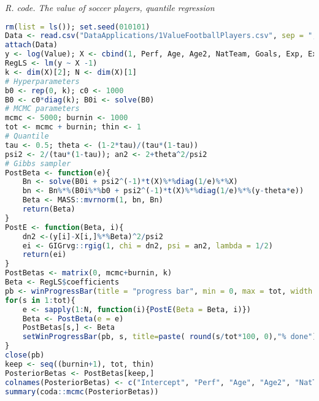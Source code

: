 \begin{enumerate}[leftmargin=*]
\begin{tcolorbox}[enhanced,width=4.67in,center upper,
	fontupper=\large\bfseries,drop shadow southwest,sharp corners]
	\textit{R. code. The value of soccer players, quantile regression}
	\begin{VF}
		\begin{lstlisting}[language=R]
rm(list = ls()); set.seed(010101)
Data <- read.csv("DataApplications/1ValueFootballPlayers.csv", sep = ",", header = TRUE, fileEncoding = "latin1")
attach(Data)
y <- log(Value); X <- cbind(1, Perf, Age, Age2, NatTeam, Goals, Exp, Exp2)
RegLS <- lm(y ~ X -1)
k <- dim(X)[2]; N <- dim(X)[1]
# Hyperparameters
b0 <- rep(0, k); c0 <- 1000
B0 <- c0*diag(k); B0i <- solve(B0)
# MCMC parameters
mcmc <- 5000; burnin <- 1000
tot <- mcmc + burnin; thin <- 1
# Quantile
tau <- 0.5; theta <- (1-2*tau)/(tau*(1-tau))
psi2 <- 2/(tau*(1-tau)); an2 <- 2+theta^2/psi2
# Gibbs sampler
PostBeta <- function(e){
	Bn <- solve(B0i + psi2^(-1)*t(X)%*%diag(1/e)%*%X)
	bn <- Bn%*%(B0i%*%b0 + psi2^(-1)*t(X)%*%diag(1/e)%*%(y-theta*e))
	Beta <- MASS::mvrnorm(1, bn, Bn)
	return(Beta)
}
PostE <- function(Beta, i){
	dn2 <-(y[i]-X[i,]%*%Beta)^2/psi2
	ei <- GIGrvg::rgig(1, chi = dn2, psi = an2, lambda = 1/2)
	return(ei)
}
PostBetas <- matrix(0, mcmc+burnin, k)
Beta <- RegLS$coefficients
pb <- winProgressBar(title = "progress bar", min = 0, max = tot, width = 300)
for(s in 1:tot){
	e <- sapply(1:N, function(i){PostE(Beta = Beta, i)})
	Beta <- PostBeta(e = e)
	PostBetas[s,] <- Beta
	setWinProgressBar(pb, s, title=paste( round(s/tot*100, 0),"% done"))
}
close(pb)
keep <- seq((burnin+1), tot, thin)
PosteriorBetas <- PostBetas[keep,]
colnames(PosteriorBetas) <- c("Intercept", "Perf", "Age", "Age2", "NatTeam", "Goals", "Exp", "Exp2")
summary(coda::mcmc(PosteriorBetas))
\end{lstlisting}
	\end{VF}
\end{tcolorbox}	

\end{enumerate}